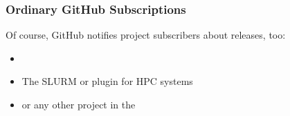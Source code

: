 \begin{frame}
	\frametitle{Ordinary GitHub Subscriptions}
	Of course, GitHub notifies project subscribers about releases, too:
	\begin{itemize}
		\item {}
		\item {The SLURM} or  plugin for HPC systems
		\item or any other project in the 
	\end{itemize}
\end{frame}